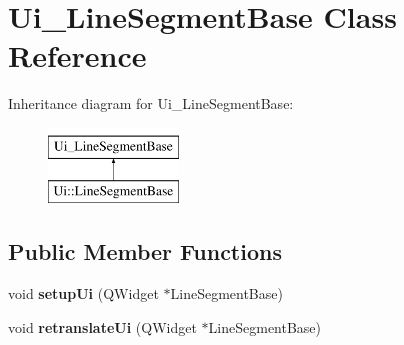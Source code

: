 \hypertarget{class_ui___line_segment_base}{}\section{Ui\+\_\+\+Line\+Segment\+Base Class Reference}
\label{class_ui___line_segment_base}
Inheritance diagram for Ui\+\_\+\+Line\+Segment\+Base\+:\begin{figure}[H]
\begin{center}
\leavevmode
\includegraphics[height=2.000000cm]{class_ui___line_segment_base}
\end{center}
\end{figure}
\subsection*{Public Member Functions}
\begin{DoxyCompactItemize}
\item 
\mbox{\label{class_ui___line_segment_base_a1f910172ba2ec63bc1e713aa300f2a27}} 
void {\bfseries setup\+Ui} (Q\+Widget $\ast$Line\+Segment\+Base)
\item 
\mbox{\label{class_ui___line_segment_base_a4acc998e6b134b6e1e360a136620429b}} 
void {\bfseries retranslate\+Ui} (Q\+Widget $\ast$Line\+Segment\+Base)
\end{DoxyCompactItemize}

